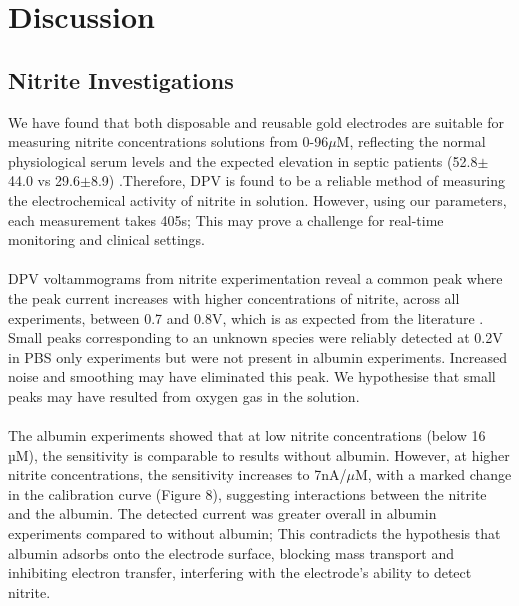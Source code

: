 \section{Discussion}





\subsection{Nitrite Investigations}
We have found that  both disposable and reusable gold electrodes are suitable for measuring nitrite concentrations solutions from 0-96$\mu$M, reflecting the normal physiological serum levels and the expected elevation in septic patients (52.8$\pm$44.0 vs 29.6$\pm$8.9) \cite{pmid12688539}.Therefore, DPV is found to be a reliable method of measuring the electrochemical activity of nitrite in solution. However, using our parameters, each measurement takes 405s; This may prove a challenge for real-time monitoring and clinical settings.\\\\
DPV voltammograms from nitrite experimentation reveal a common peak where the peak current increases with higher concentrations of nitrite, across all experiments, between 0.7 and 0.8V, which is as expected from the literature \cite{article}. Small peaks corresponding to an unknown species were reliably detected at 0.2V in PBS only experiments but were not present in albumin experiments. Increased noise and smoothing may have eliminated this peak. We hypothesise that small peaks may have resulted from oxygen gas in the  solution.\\\\
The albumin experiments showed that at low nitrite concentrations (below 16 µM), the sensitivity is comparable to results without albumin. However, at higher nitrite concentrations, the sensitivity increases to 7nA/$\mu$M, with a marked change in the calibration curve (Figure 8), suggesting interactions between the nitrite and the albumin. The detected current was greater overall in albumin experiments compared to without albumin; This contradicts the hypothesis that albumin adsorbs onto the electrode surface, blocking mass transport and inhibiting electron transfer, interfering with the electrode's ability to detect nitrite.

